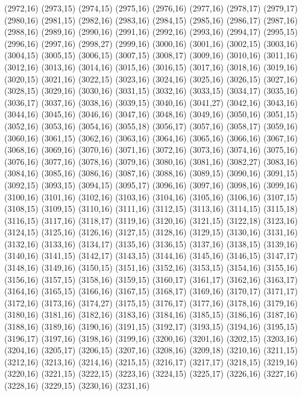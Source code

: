 (2972,16)
(2973,15)
(2974,15)
(2975,16)
(2976,16)
(2977,16)
(2978,17)
(2979,17)
(2980,16)
(2981,15)
(2982,16)
(2983,16)
(2984,15)
(2985,16)
(2986,17)
(2987,16)
(2988,16)
(2989,16)
(2990,16)
(2991,16)
(2992,16)
(2993,16)
(2994,17)
(2995,15)
(2996,16)
(2997,16)
(2998,27)
(2999,16)
(3000,16)
(3001,16)
(3002,15)
(3003,16)
(3004,15)
(3005,15)
(3006,15)
(3007,15)
(3008,17)
(3009,16)
(3010,16)
(3011,16)
(3012,16)
(3013,16)
(3014,16)
(3015,16)
(3016,15)
(3017,16)
(3018,16)
(3019,16)
(3020,15)
(3021,16)
(3022,15)
(3023,16)
(3024,16)
(3025,16)
(3026,15)
(3027,16)
(3028,15)
(3029,16)
(3030,16)
(3031,15)
(3032,16)
(3033,15)
(3034,17)
(3035,16)
(3036,17)
(3037,16)
(3038,16)
(3039,15)
(3040,16)
(3041,27)
(3042,16)
(3043,16)
(3044,16)
(3045,16)
(3046,16)
(3047,16)
(3048,16)
(3049,16)
(3050,16)
(3051,15)
(3052,16)
(3053,16)
(3054,16)
(3055,18)
(3056,17)
(3057,16)
(3058,17)
(3059,16)
(3060,16)
(3061,15)
(3062,16)
(3063,16)
(3064,16)
(3065,16)
(3066,16)
(3067,16)
(3068,16)
(3069,16)
(3070,16)
(3071,16)
(3072,16)
(3073,16)
(3074,16)
(3075,16)
(3076,16)
(3077,16)
(3078,16)
(3079,16)
(3080,16)
(3081,16)
(3082,27)
(3083,16)
(3084,16)
(3085,16)
(3086,16)
(3087,16)
(3088,16)
(3089,15)
(3090,16)
(3091,15)
(3092,15)
(3093,15)
(3094,15)
(3095,17)
(3096,16)
(3097,16)
(3098,16)
(3099,16)
(3100,16)
(3101,16)
(3102,16)
(3103,16)
(3104,16)
(3105,16)
(3106,16)
(3107,15)
(3108,15)
(3109,15)
(3110,16)
(3111,16)
(3112,15)
(3113,16)
(3114,15)
(3115,18)
(3116,15)
(3117,16)
(3118,17)
(3119,16)
(3120,16)
(3121,15)
(3122,18)
(3123,16)
(3124,15)
(3125,16)
(3126,16)
(3127,15)
(3128,16)
(3129,15)
(3130,16)
(3131,16)
(3132,16)
(3133,16)
(3134,17)
(3135,16)
(3136,15)
(3137,16)
(3138,15)
(3139,16)
(3140,16)
(3141,15)
(3142,17)
(3143,15)
(3144,16)
(3145,16)
(3146,15)
(3147,17)
(3148,16)
(3149,16)
(3150,15)
(3151,16)
(3152,16)
(3153,15)
(3154,16)
(3155,16)
(3156,16)
(3157,15)
(3158,16)
(3159,15)
(3160,17)
(3161,17)
(3162,16)
(3163,17)
(3164,16)
(3165,15)
(3166,16)
(3167,15)
(3168,17)
(3169,16)
(3170,17)
(3171,17)
(3172,16)
(3173,16)
(3174,27)
(3175,15)
(3176,17)
(3177,16)
(3178,16)
(3179,16)
(3180,16)
(3181,16)
(3182,16)
(3183,16)
(3184,16)
(3185,15)
(3186,16)
(3187,16)
(3188,16)
(3189,16)
(3190,16)
(3191,15)
(3192,17)
(3193,15)
(3194,16)
(3195,15)
(3196,17)
(3197,16)
(3198,16)
(3199,16)
(3200,16)
(3201,16)
(3202,15)
(3203,16)
(3204,16)
(3205,17)
(3206,15)
(3207,16)
(3208,16)
(3209,18)
(3210,16)
(3211,15)
(3212,16)
(3213,16)
(3214,16)
(3215,15)
(3216,17)
(3217,17)
(3218,15)
(3219,16)
(3220,16)
(3221,15)
(3222,15)
(3223,16)
(3224,15)
(3225,17)
(3226,16)
(3227,16)
(3228,16)
(3229,15)
(3230,16)
(3231,16)
